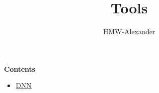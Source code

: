 \documentclass[letterpaper,11pt]{article}
\title{\textbf{Tools}}
\author{HMW-Alexander}
\begin{document}
\maketitle

\textbf{Contents}
\begin{itemize}
	\item \href{./DNN/index.html}{DNN}
\end{itemize}
	
\end{document}
